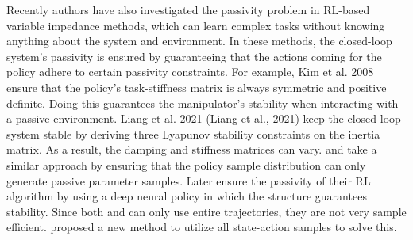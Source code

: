 Recently authors have also investigated the passivity problem in RL-based variable impedance methods, which can learn complex tasks without knowing anything about the system and environment. In these methods, the closed-loop system's passivity is ensured by guaranteeing that the actions coming for the policy adhere to certain passivity constraints. For example, Kim et al. 2008 \cite{kimLearningRobotStiffness2008} ensure that the policy's task-stiffness matrix is always symmetric and positive definite. Doing this guarantees the manipulator's stability when interacting with a passive environment. Liang et al. 2021 (Liang et al., 2021) keep the closed-loop system stable by deriving three Lyapunov stability constraints on the inertia matrix. As a result, the damping and stiffness matrices can vary.\cite{reyLearningMotionsDemonstrations2018} and \cite{khaderStabilityGuaranteedReinforcementLearning2020} take a similar approach by ensuring that the policy sample distribution can only generate passive parameter samples. Later \cite{khaderLearningDeepEnergy2021} ensure the passivity of their RL algorithm by using a deep neural policy in which the structure guarantees stability. Since both \cite{khaderStabilityGuaranteedReinforcementLearning2020,reyLearningMotionsDemonstrations2018} and \cite{khaderLearningDeepEnergy2021} can only use entire trajectories, they are not very sample efficient. \cite{khaderLearningStableNormalizingFlow2021} proposed a new method to utilize all state-action samples to solve this.

